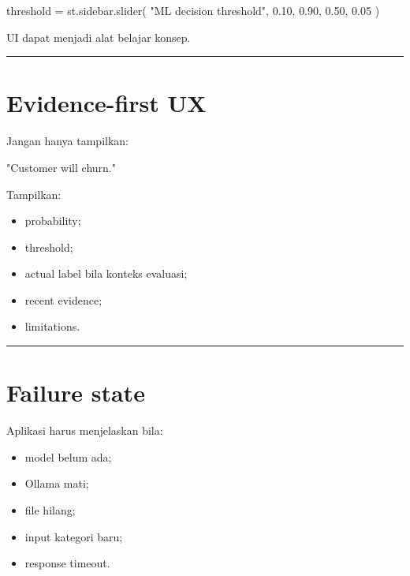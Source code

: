 \documentclass[
  indonesian,
  letterpaper,
  DIV=11,
  numbers=noendperiod]{scrreprt}
\newenvironment{Shaded}{\begin{snugshade}}{\end{snugshade}}
\newcommand{\FloatTok}[1]{\textcolor[rgb]{0.68,0.00,0.00}{#1}}
\newcommand{\NormalTok}[1]{\textcolor[rgb]{0.00,0.23,0.31}{#1}}
\newcommand{\OperatorTok}[1]{\textcolor[rgb]{0.37,0.37,0.37}{#1}}
\newcommand{\StringTok}[1]{\textcolor[rgb]{0.13,0.47,0.30}{#1}}
\providecommand{\tightlist}{%
  \setlength{\itemsep}{0pt}\setlength{\parskip}{0pt}}
\begin{document}
\begin{Shaded}
\begin{Highlighting}[]
\NormalTok{threshold }\OperatorTok{=}\NormalTok{ st.sidebar.slider(}
    \StringTok{"ML decision threshold"}\NormalTok{,}
    \FloatTok{0.10}\NormalTok{, }\FloatTok{0.90}\NormalTok{, }\FloatTok{0.50}\NormalTok{, }\FloatTok{0.05}
\NormalTok{)}
\end{Highlighting}
\end{Shaded}

UI dapat menjadi alat belajar konsep.

\begin{center}\rule{0.5\linewidth}{0.5pt}\end{center}

\section{Evidence-first UX}\label{evidence-first-ux}

Jangan hanya tampilkan:

\begin{Shaded}
\begin{Highlighting}[]
\NormalTok{"Customer will churn."}
\end{Highlighting}
\end{Shaded}

Tampilkan:

\begin{itemize}
\tightlist
\item
  probability;
\item
  threshold;
\item
  actual label bila konteks evaluasi;
\item
  recent evidence;
\item
  limitations.
\end{itemize}

\begin{center}\rule{0.5\linewidth}{0.5pt}\end{center}

\section{Failure state}\label{failure-state}

Aplikasi harus menjelaskan bila:

\begin{itemize}
\tightlist
\item
  model belum ada;
\item
  Ollama mati;
\item
  file hilang;
\item
  input kategori baru;
\item
  response timeout.
\end{itemize}
\end{document}
